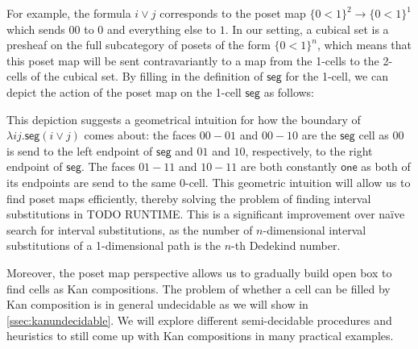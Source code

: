 \documentclass[11pt]{article}
\theoremstyle{definition}
\newcommand{\cset}[1]{\ensuremath{\mathsf{{#1}}}}
\begin{document}
For example, the formula $i \vee j$ corresponds to the poset map $\{ 0<1 \}^2
\to \{ 0<1 \}^1$ which sends $00$ to $0$ and everything else to $1$. In our
setting, a cubical set
is a presheaf on the full subcategory of posets of the form $\{ 0<1 \}^n$, which
means that this poset map will be sent contravariantly to a map from the 1-cells
to the 2-cells of the cubical set. By filling in the definition of \cset{seg}
for the 1-cell, we can depict the action of the poset map on the 1-cell
\cset{seg} as follows:
\begin{center}
\end{center}

This depiction suggests a geometrical intuition for how the boundary of $\lambda i
j.\cset{seg} (i \vee j)$ comes about: the faces $00-01$ and $00-10$ are the
\cset{seg} cell as $00$ is send to the left endpoint of \cset{seg} and $01$ and
$10$, respectively, to the right endpoint of \cset{seg}. The faces $01-11$ and $10-11$
are both constantly \cset{one} as both of its endpoints are send to the same
0-cell. This geometric intuition will allow us to find poset maps
efficiently, thereby solving the problem of finding interval substitutions in
TODO RUNTIME. This is a significant improvement over na\"ive search for
interval substitutions, as the number of $n$-dimensional interval substitutions of a
1-dimensional path is the $n$-th Dedekind number.

Moreover, the poset map perspective allows us to gradually build open box to
find cells as Kan compositions. The problem of whether a cell can be filled by
Kan composition is in general undecidable as we will show in
\autoref{ssec:kanundecidable}. We will explore different semi-decidable
procedures and heuristics to still come up with Kan compositions in many
practical examples.
\end{document}
